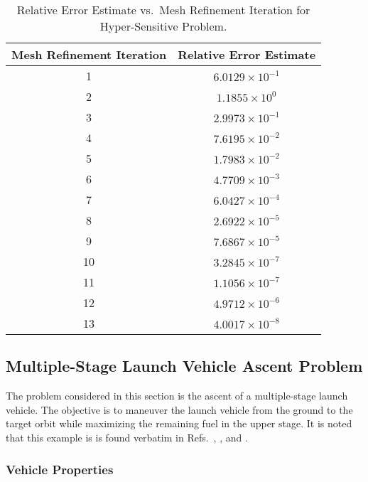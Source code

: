 \documentclass[10pt]{article}
\begin{document}
\begin{table}[h]
\centering
 \caption{Relative Error Estimate vs.~Mesh Refinement Iteration for
  Hyper-Sensitive Problem. \label{tab:hyperSensitiveMeshRefinement}}
\small
\begin{tabular}{|c|c|} \hline
{\bf Mesh Refinement Iteration} & {\bf Relative Error Estimate} \\\hline\hline
 1 & $6.0129\times 10^{-1}$ \\\hline
 2 & $1.1855\times 10^{0}$ \\\hline
 3 & $2.9973\times 10^{-1}$ \\\hline
 4 & $7.6195\times 10^{-2}$ \\\hline
 5 & $1.7983\times 10^{-2}$ \\\hline
 6 & $4.7709\times 10^{-3}$ \\\hline
 7 & $6.0427\times 10^{-4}$ \\\hline
 8 & $2.6922\times 10^{-5}$ \\\hline
 9 & $7.6867\times 10^{-5}$ \\\hline
 10 & $3.2845\times 10^{-7}$ \\\hline
 11 & $1.1056\times 10^{-7}$ \\\hline
 12 & $4.9712\times 10^{-6}$ \\\hline
 13 & $4.0017\times 10^{-8}$ \\\hline
\end{tabular}
\end{table}

\clearpage

\subsection{Multiple-Stage Launch Vehicle Ascent Problem}

The problem considered in this section is the ascent of a
multiple-stage launch vehicle.  The objective is to maneuver the
launch vehicle from the ground to the target orbit while maximizing
the remaining fuel in the upper stage.   It is noted that this example
is is found verbatim in Refs.~, ,
and .  

\subsubsection{Vehicle Properties}
\end{document}

